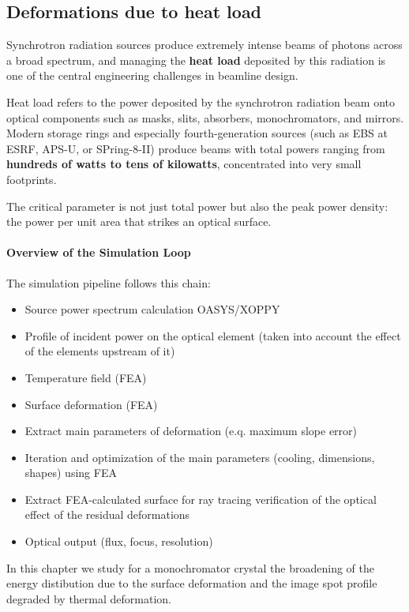 \subsection{Deformations due to heat load}


Synchrotron radiation sources produce extremely intense beams of photons across a broad spectrum, and managing the \textbf{heat load} deposited by this radiation is one of the central engineering challenges in beamline design.

Heat load refers to the power deposited by the synchrotron radiation beam onto optical components such as masks, slits, absorbers, monochromators, and mirrors. Modern storage rings and especially fourth-generation sources (such as EBS at ESRF, APS-U, or SPring-8-II) produce beams with total powers ranging from \textbf{hundreds of watts to tens of kilowatts}, concentrated into very small footprints.

The critical parameter is not just total power but also the peak power density: the power per unit area that strikes an optical surface.


\paragraph{Overview of the Simulation Loop}

The simulation pipeline follows this chain:

\begin{itemize}
    \item Source power spectrum calculation OASYS/XOPPY
    \item Profile of incident power on the optical element (taken into account the effect of the elements upstream of it)
    \item Temperature field (FEA)
    \item Surface deformation (FEA)
    \item Extract main parameters of deformation (e.q. maximum slope error)
    \item Iteration and optimization of the main parameters (cooling, dimensions, shapes) using FEA
    \item Extract FEA-calculated surface for ray tracing verification of the optical effect of the residual deformations
    \item Optical output (flux, focus, resolution)
\end{itemize}

In this chapter we study for a monochromator crystal the broadening of the energy distibution due to the surface deformation and the image spot profile degraded by thermal deformation.
